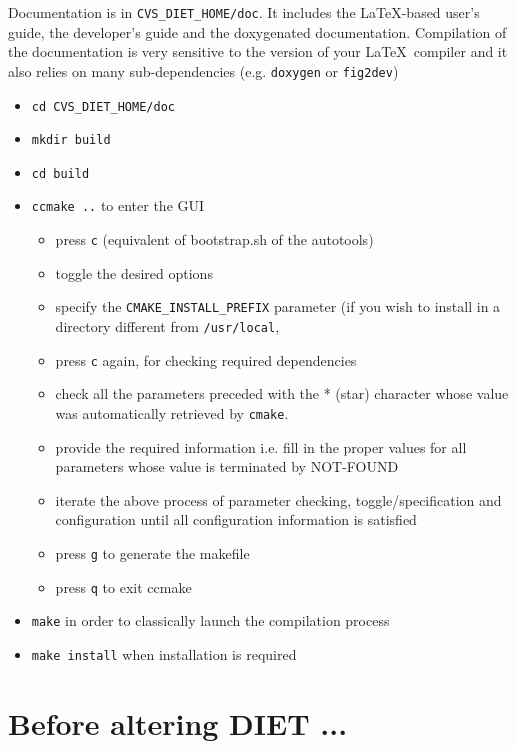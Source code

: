 Documentation is in \verb+CVS_DIET_HOME/doc+. It includes the LaTeX-based 
user's guide, the developer's guide and the doxygenated documentation.
Compilation of the documentation is very sensitive to the version of your
\LaTeX\ compiler and it also relies on many sub-dependencies
  (e.g. \verb+doxygen+ or \verb+fig2dev+)

\begin{itemize}
\item
  \verb+cd CVS_DIET_HOME/doc+
\item
  \verb+mkdir build+
\item
  \verb+cd build+
\item
  \verb+ccmake ..+ to enter the GUI
  \begin{itemize}
  \item press \verb+c+ (equivalent of bootstrap.sh of the autotools)
  \item toggle the desired options 
  \item specify the \verb+CMAKE_INSTALL_PREFIX+ parameter (if you wish
     to install in a directory different from \verb+/usr/local+,
  \item press \verb+c+ again, for checking required dependencies
  \item check all the parameters preceded with the * (star) character
     whose value was automatically retrieved by \verb+cmake+.
  \item provide the required information i.e. fill in the proper values
     for all parameters whose value is terminated by NOT-FOUND
  \item iterate the above process of parameter checking, toggle/specification
     and configuration until all configuration information is satisfied
  \item press \verb+g+ to generate the makefile
  \item press \verb+q+ to exit ccmake
  \end{itemize}
\item
  \verb+make+ in order to classically launch the compilation process
\item
  \verb+make install+ when installation is required
\end{itemize}


\section{Before altering DIET ...}

